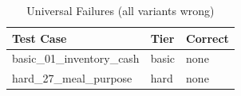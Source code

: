 \begin{table}[htbp]
\centering
\caption{Universal Failures (all variants wrong)}
\label{tab:all-fail}
\begin{tabular}{l l l}
\toprule
Test Case & Tier & Correct \\
\midrule
  basic\_01\_inventory\_cash & basic & none \\
  hard\_27\_meal\_purpose & hard & none \\
\bottomrule
\end{tabular}
\end{table}
